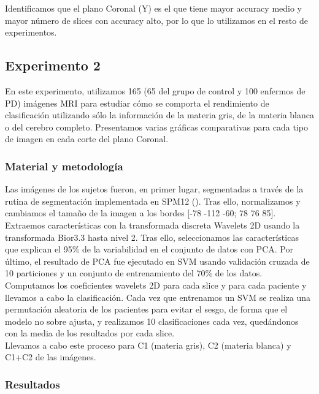 Identificamos que el plano Coronal (Y) es el que tiene mayor accuracy medio y mayor número de slices con accuracy alto, por lo que lo utilizamos en el resto de experimentos.

\newpage 
\subsection{Experimento 2}

En este experimento, utilizamos 165 (65 del grupo de control y 100 enfermos de PD) imágenes MRI para estudiar cómo se comporta el rendimiento de clasificación utilizando sólo la información de la materia gris, de la materia blanca o del cerebro completo. Presentamos varias gráficas comparativas para cada tipo de imagen en cada corte del plano Coronal.

\subsubsection{Material y metodología}

Las imágenes de los sujetos fueron, en primer lugar, segmentadas a través de la rutina de segmentación implementada en SPM12 (\cite{spm}). Tras ello, normalizamos y cambiamos el tamaño de la imagen a los bordes [-78 -112 -60; 78 76 85]. Extraemos características con la transformada discreta Wavelets 2D usando la transformada Bior3.3 hasta nivel 2. Tras ello, seleccionamos las características que explican el 95\% de la variabilidad en el conjunto de datos con PCA. Por último, el resultado de PCA fue ejecutado en SVM usando validación cruzada de 10 particiones y un conjunto de entrenamiento del 70\% de los datos. \\

Computamos los coeficientes wavelets 2D para cada slice y para cada paciente y llevamos a cabo la clasificación. Cada vez que entrenamos un SVM se realiza una permutación aleatoria de los pacientes para evitar el sesgo, de forma que el modelo no sobre ajusta, y realizamos 10 clasificaciones cada vez, quedándonos con la media de los resultados por cada slice. \\

Llevamos a cabo este proceso para C1 (materia gris), C2 (materia blanca) y C1+C2 de las imágenes. 

\subsubsection{Resultados}

